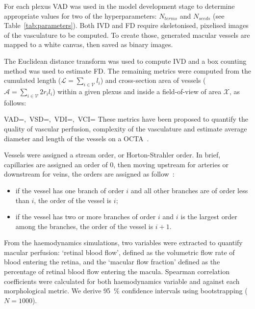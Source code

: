 \documentclass[11pt,]{article}
\let\oldequation\equation
\let\oldendequation\endequation
\renewenvironment{equation}
  {\linenomathNonumbers\oldequation}
  {\oldendequation\endlinenomath}
\begin{document}
For each plexus VAD was used in the model development stage to determine appropriate values for two of the hyperparameters: $N_{terms}$ and $N_{seeds}$ (see Table~\ref{tab:parameters}).
Both IVD and FD require skeletonised, pixelised images of the vasculature to be computed.
To create those, generated macular vessels are mapped to a white canvas, then saved as binary images.

The Euclidean distance transform was used to compute IVD and a box counting method was used to estimate FD. The remaining metrics were computed from the cumulated length ($\mathcal L=\sum_{i\in\mathcal V} l_i$) and cross-section area of vessels ($\mathcal A=\sum_{i\in\mathcal V} 2r_il_i$) within a given plexus and inside a field-of-view of area $\mathcal X$,  as follows:

\begin{equation}\label{eq:OCTAmetrics}
VAD=,\ VSD=,\ VDI=,\ VCI=
\end{equation}
These metrics have been proposed to quantify the quality of vascular perfusion, complexity of the vasculature and estimate average diameter and length of the vessels on a OCTA~\cite{Chu2016}. 

Vessels were assigned a stream order, or Horton-Strahler order.
In brief, capillaries are assigned an order of 0, then moving upstream for arteries or downstream for veins, the orders are assigned as follow~\cite{An2020}:
\begin{itemize}
\item if the vessel has one branch of order $i$ and all other branches are of order less than $i$, the order of the vessel is $i$;
\item if the vessel has two or more branches of order $i$ and $i$ is the largest order among the branches, the order of the vessel is $i+1$.
\end{itemize}

From the haemodynamics simulations, two variables were extracted to quantify macular perfusion: `retinal blood flow', defined as the volumetric flow rate of blood entering the retina, and the `macular flow fraction' defined as the percentage of retinal blood flow entering the macula.
Spearman correlation coefficients were calculated for both haemodynamics variable and against each morphological metric.
We derive \SI{95}{\percent} confidence intervals using bootstrapping ($N=1000$).
\end{document}
